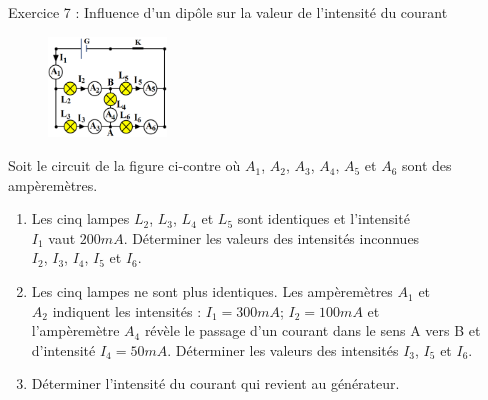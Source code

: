 \documentclass[12pt, french]{article}
\begin{document}
\begin{Box2}{Exercice 7 : Influence d'un dipôle sur la valeur de l'intensité du courant  }
	\begin{figure}
  \begin{center}
	  \vspace{-0.6cm}
	\includegraphics[width=0.28\textwidth]{./img/ex07.png}
  \end{center}
\end{figure}
Soit le circuit de la figure ci-contre où $A_1$, $A_2$, $A_3$, $A_4$, $A_5$ et $A_6$
sont des ampèremètres.
\begin{enumerate}
	\item  Les cinq lampes $L_2$, $L_3$, $L_4$ et $L_5$ sont identiques et
l’intensité\\ $I_1$ vaut $200mA$. Déterminer les valeurs des
intensités inconnues \\$I_2$, $I_3$, $I_4$, $I_5$ et $I_6$.

\item Les cinq lampes ne sont plus identiques. Les ampèremètres
$A_1$ et \\$A_2$ indiquent les intensités : $I_1=300 mA$; $I_2=100mA$ et
\\l’ampèremètre $A_4$ révèle le passage d’un courant dans le
sens A vers B et \\d’intensité $I_4=50 mA$. Déterminer les
valeurs des intensités $I_3$, $I_5$ et $I_6$.

\item Déterminer l’intensité du courant qui revient au générateur.
\end{enumerate}

\end{Box2}
\end{document}
